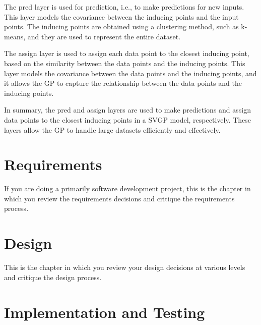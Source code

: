 \documentclass[12pt,a4paper]{report}
\begin{document}
The pred layer is used for prediction, i.e., to make predictions for new inputs. 
This layer models the covariance between the inducing points and the input points. 
The inducing points are obtained using a clustering method, such as k-means, and they are used to represent the entire dataset.

The assign layer is used to assign each data point to the closest inducing point, based on the similarity between the data points and the inducing points. 
This layer models the covariance between the data points and the inducing points, and it allows the GP to capture the relationship between the data points and the inducing points.

In summary, the pred and assign layers are used to make predictions and assign data points to the closest inducing points in a SVGP model, respectively. 
These layers allow the GP to handle large datasets efficiently and effectively.


\chapter{Requirements}

If you are doing a primarily software development project, this is the chapter in which you review the requirements decisions and critique the requirements process.

\chapter{Design}

This is the chapter in which you review your design decisions at various
levels and critique the design process.

\chapter{Implementation and Testing}
\end{document}
